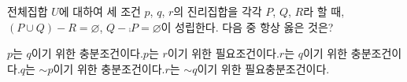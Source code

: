 전체집합 $U$에 대하여 세 조건 $p$, $q$, $r$의 진리집합을 각각 $P$, $Q$, $R$라 할 때, $(P\cup Q)-R=\varnothing$, $Q-\comp{P}=\varnothing$이 성립한다. 다음 중 항상 옳은 것은? 
\begin{choicesv}{$p$는 $q$이기 위한 충분조건이다.}{$p$는 $r$이기 위한 필요조건이다.}{$r$는 $q$이기 위한 충분조건이다.}{$q$는 ${\sim}p$이기 위한 충분조건이다.}{$r$는 ${\sim}q$이기 위한 필요충분조건이다.}\end{choicesv}
